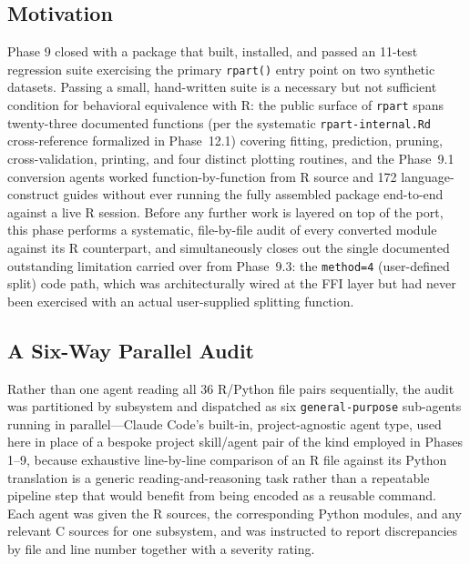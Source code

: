 \documentclass[12pt]{article}
\begin{document}
\subsection{Motivation}

Phase 9 closed with a package that built, installed, and passed an 11-test regression suite exercising the primary \texttt{rpart()} entry point on two synthetic datasets. Passing a small, hand-written suite is a necessary but not sufficient condition for behavioral equivalence with R: the public surface of \texttt{rpart} spans twenty-three documented functions (per the systematic \texttt{rpart-internal.Rd} cross-reference formalized in Phase~12.1) covering fitting, prediction, pruning, cross-validation, printing, and four distinct plotting routines, and the Phase~9.1 conversion agents worked function-by-function from R source and 172 language-construct guides without ever running the fully assembled package end-to-end against a live R session. Before any further work is layered on top of the port, this phase performs a systematic, file-by-file audit of every converted module against its R counterpart, and simultaneously closes out the single documented outstanding limitation carried over from Phase~9.3: the \texttt{method=4} (user-defined split) code path, which was architecturally wired at the FFI layer but had never been exercised with an actual user-supplied splitting function.

\subsection{A Six-Way Parallel Audit}

Rather than one agent reading all 36 R/Python file pairs sequentially, the audit was partitioned by subsystem and dispatched as six \texttt{general-purpose} sub-agents running in parallel---Claude Code's built-in, project-agnostic agent type, used here in place of a bespoke project skill/agent pair of the kind employed in Phases 1--9, because exhaustive line-by-line comparison of an R file against its Python translation is a generic reading-and-reasoning task rather than a repeatable pipeline step that would benefit from being encoded as a reusable command. Each agent was given the R sources, the corresponding Python modules, and any relevant C sources for one subsystem, and was instructed to report discrepancies by file and line number together with a severity rating.
\end{document}
